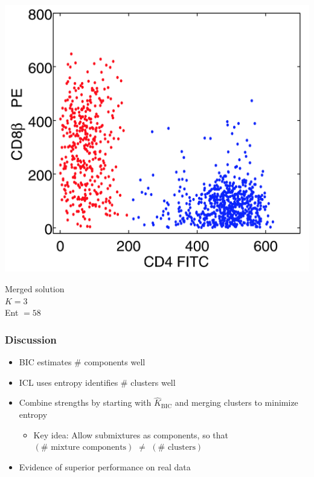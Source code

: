 \documentclass[mathserif,compress]{beamer}
\newcommand*\estim[1]{\widehat{#1}}
\renewcommand\;{\,}
\begin{document}
\begin{frame}
\begin{center}
\begin{minipage}{0.3\linewidth}
\includegraphics[width=\linewidth]{Combined_control.png}
\begin{center}
Merged solution
\\
$K = 3$
\\
Ent $= 58$
\end{center}
\end{minipage}
\end{center}
\end{frame}

\begin{frame}\frametitle{Discussion}
\begin{itemize}
\item[]
BIC estimates \# components well 
\bigskip
\item[]
ICL uses entropy identifies \# clusters well
\bigskip
\item[]
Combine strengths by starting with $\estim K_\text{BIC}$ and merging clusters to minimize entropy
\bigskip
\begin{itemize}
\item
Key idea: Allow submixtures as components, so that $\left(\# \text{ mixture components}\right)$ 
$\ne$ 
$\left(\# \text{ clusters} \right)$
\end{itemize}
\bigskip
\item[]
Evidence of superior performance on real data 
\end{itemize}
\end{frame}
\end{document}
